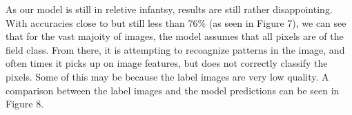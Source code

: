 \documentclass[12pt]{article}
\begin{document}
As our model is still in reletive infantsy, results are still rather disappointing. With accuracies close to but still less than 76\% (as seen in Figure 7), we can see that for the vast majoity of images, the model assumes that all pixels are of the field class. From there, it is attempting to recoagnize patterns in the image, and often times it picks up on image features, but does not correctly classify the pixels. Some of this may be because the label images are very low quality. A comparison between the label images and the model predictions can be seen in Figure 8.

\begin{figure}[!htb]
\end{figure}

\begin{figure}[!htb]
\end{figure}
\end{document}
